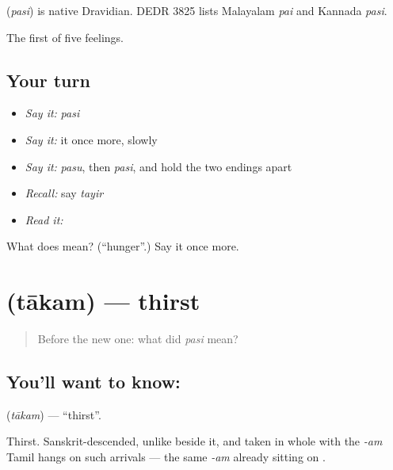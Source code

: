 \begin{cousinweb}
\textbf{} (\emph{pasi}) is native Dravidian. DEDR 3825 lists Malayalam \emph{pai} and Kannada \emph{pasi}.
\end{cousinweb}

\begin{grammarlens}[title={What you've built}]
The first of five feelings.
\end{grammarlens}

\subsection*{Your turn}
\begin{itemize}
\raggedright
  \item \emph{Say it:} \emph{pasi}
  \item \emph{Say it:} it once more, slowly
  \item \emph{Say it:} \emph{pasu}, then \emph{pasi}, and hold the two endings apart
  \item \emph{Recall:} say \emph{tayir}
  \item \emph{Read it:} \textbf{}
\end{itemize}

\begin{tcolorbox}[breakable,colback=teal!4,colframe=teal!35!black,title={Before you move on}]
What does  mean? (\textquotedblleft{}hunger\textquotedblright{}.) Say it once more.
\end{tcolorbox}
\section[\texorpdfstring{\ta{தாகம்} (tākam)}{தாகம் (tākam)}]{ (tākam) — thirst}

\label{lesson:TA-C61-thirst}



\begin{quote}
Before the new one: what did \emph{pasi} mean?
\end{quote}

\subsection*{You'll want to know: }
\textbf{} (\emph{tākam}) — \textquotedblleft{}thirst\textquotedblright{}.

Thirst. Sanskrit-descended, unlike  beside it, and taken in whole with the \emph{-am} Tamil hangs on such arrivals — the same \emph{-am} already sitting on .

